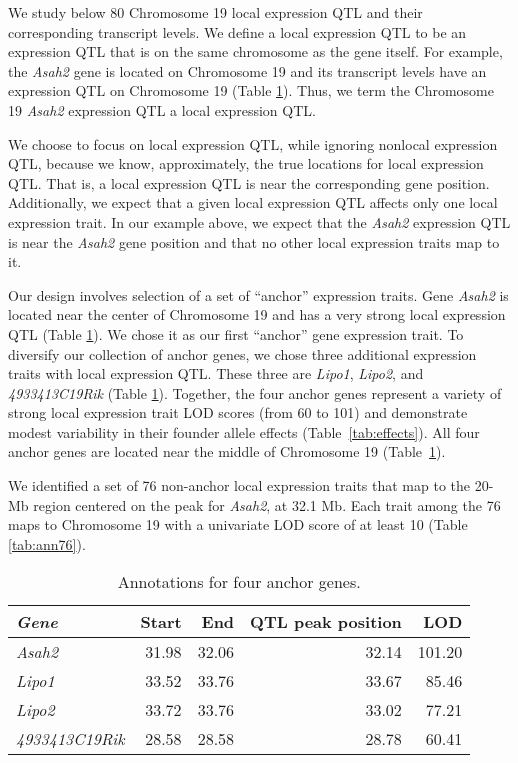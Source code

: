 \documentclass{book}
\begin{document}
We study below 80 Chromosome 19 local expression QTL and their corresponding transcript levels. We define a local expression QTL to be an expression QTL that is on the same chromosome as the gene itself. For example, the \emph{Asah2} gene is located on Chromosome 19 and its transcript levels have an expression QTL on Chromosome 19 (Table \ref{tab:ann4}). Thus, we term the Chromosome 19 \emph{Asah2} expression QTL a local expression QTL.

We choose to focus on local expression QTL, while ignoring nonlocal expression QTL, because we know, approximately, the true locations for local expression QTL. That is, a local expression QTL is near the corresponding gene position. Additionally, we expect that a given local expression QTL affects only one local expression trait. In our example above, we expect that the \emph{Asah2} expression QTL is near the \emph{Asah2} gene position and that no other local expression traits map to it.


Our design involves selection of a set of ``anchor'' expression traits. Gene \emph{Asah2} is located near the center of Chromosome 19 and has a very strong local expression QTL (Table \ref{tab:ann4}). We chose it as our first ``anchor'' gene expression trait. To diversify our collection of anchor genes, we chose three additional expression traits with local expression QTL. These three are \emph{Lipo1}, \emph{Lipo2}, and \emph{4933413C19Rik} (Table \ref{tab:ann4}). Together, the four anchor genes represent a variety of strong local expression trait LOD scores (from 60 to 101) and demonstrate modest variability in their founder allele effects (Table~\ref{tab:effects}). All four anchor genes are located near the middle of Chromosome 19 (Table~\ref{tab:ann4}).




We identified a set of 76 non-anchor local expression traits that map to the 20-Mb region centered on the peak for \emph{Asah2}, at 32.1 Mb. Each trait among the 76 maps to Chromosome 19 with a univariate LOD score of at least 10 (Table \ref{tab:ann76}).


\begin{table}[ht]
\caption{Annotations for four anchor genes.}\label{tab:ann4}
\centering
\begin{tabular}{>{\em}lrrrr}
  \hline
Gene & Start & End & QTL peak position & LOD \\
  \hline
Asah2 & 31.98 & 32.06 & 32.14 & 101.20 \\
  Lipo1 & 33.52 & 33.76 & 33.67 & 85.46 \\
  Lipo2 & 33.72 & 33.76 & 33.02 & 77.21 \\
  4933413C19Rik & 28.58 & 28.58 & 28.78 & 60.41 \\
   \hline
\end{tabular}
\end{table}
\end{document}
